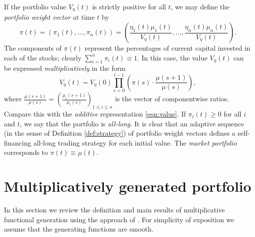 \documentclass[graybox]{svmult}
\begin{document}
If the portfolio value $V_{\eta}(t)$ is strictly positive for all $t$, we may define the {\it portfolio weight vector} at time $t$ by
\begin{equation} \label{eqn:portfolio.process}
\pi(t) = (\pi_1(t), \ldots, \pi_n(t)) = \left( \frac{\eta_1(t) \mu_1(t)}{V_{\eta}(t)}, \ldots, \frac{\eta_n(t) \mu_n(t)}{V_{\eta}(t)}\right).
\end{equation}
The components of $\pi(t)$ represent the percentages of current capital invested in each of the stocks; clearly $\sum_{i = 1}^n \pi_i(t) \equiv 1$. In this case, the value $V_{\eta}(t)$ can be expressed {\it multiplicatively} in the form
\begin{equation} \label{eqn:V.multiplicative}
V_{\eta}(t) = V_{\eta}(0) \prod_{s = 0}^{t - 1} \left(\pi(s) \cdot \frac{\mu(s + 1)}{\mu(s)}\right),
\end{equation}
where $\frac{\mu(s + 1)}{\mu(s)} = \left( \frac{\mu_i(s + 1)}{\mu_i(s)} \right)_{1 \leq i \leq n}$ is the vector of componentwise ratios. Compare this with the {\it additive} representation \eqref{eqn:value}. If $\pi_i(t) \geq 0$ for all $i$ and $t$, we say that the portfolio is {\it all-long}. It is clear that an adaptive sequence (in the sense of Definition \ref{def:strategy}) of portfolio weight vectors defines a self-financing all-long trading strategy for each initial value. The {\it market portfolio} corresponds to $\pi(t) \equiv \mu(t)$.



\section{Multiplicatively generated portfolio} \label{sec:fgp}
In this section we review the definition and main results of multiplicative functional generation using the approach of \cite{PW15}. For simplicity of exposition we assume that the generating functions are smooth.
\end{document}
